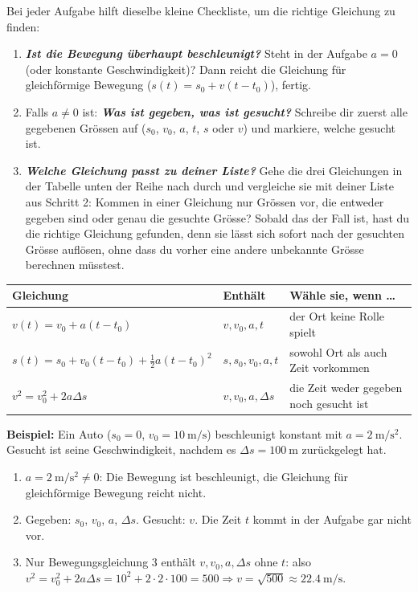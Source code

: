 \documentclass[addpoints,11pt,a4paper]{exam}
\begin{document}
\begin{anleitungbox}
Bei jeder Aufgabe hilft dieselbe kleine Checkliste, um die richtige
Gleichung zu finden:

\begin{enumerate}[leftmargin=1.2cm,itemsep=0.3em]
  \item \textbf{\emph{Ist die Bewegung überhaupt beschleunigt?}} Steht in
  der Aufgabe $a=0$ (oder \glqq konstante Geschwindigkeit\grqq{})? Dann
  reicht die Gleichung für gleichförmige Bewegung
  ($s(t)=s_0+v(t-t_0)$), fertig.
  \item Falls $a\neq0$ ist: \textbf{\emph{Was ist gegeben, was ist
  gesucht?}} Schreibe dir zuerst alle gegebenen Grössen auf
  ($s_0$, $v_0$, $a$, $t$, $s$ oder $v$) und markiere, welche gesucht
  ist.
  \item \textbf{\emph{Welche Gleichung passt zu deiner Liste?}} Gehe die
  drei Gleichungen in der Tabelle unten der Reihe nach durch und
  vergleiche sie mit deiner Liste aus Schritt 2: Kommen in einer Gleichung
  nur Grössen vor, die entweder gegeben sind oder genau die gesuchte
  Grösse? Sobald das der Fall ist, hast du die richtige Gleichung
  gefunden, denn sie lässt sich sofort nach der gesuchten Grösse auflösen,
  ohne dass du vorher eine andere unbekannte Grösse berechnen müsstest.
\end{enumerate}

\begin{center}
{\small
\setlength{\tabcolsep}{4pt}
\begin{tabular}{p{7.6cm}p{2.6cm}p{3.7cm}}
\toprule
\textbf{Gleichung} & \textbf{Enthält} & \textbf{Wähle sie, wenn \dots} \\
\midrule
$v(t)=v_0+a(t-t_0)$ & $v,v_0,a,t$ & der Ort keine Rolle spielt \\[0.3em]
$s(t)=s_0+v_0(t-t_0)+\frac{1}{2}a(t-t_0)^2$ & $s,s_0,v_0,a,t$ & sowohl Ort als auch Zeit vorkommen \\[0.3em]
$v^2=v_0^2+2a\Delta s$ & $v,v_0,a,\Delta s$ & die Zeit weder gegeben noch gesucht ist \\
\bottomrule
\end{tabular}
}
\end{center}

\textbf{Beispiel:} Ein Auto ($s_0=0$, $v_0=\SI{10}{\meter\per\second}$)
beschleunigt konstant mit $a=\SI{2}{\meter\per\second\squared}$. Gesucht
ist seine Geschwindigkeit, nachdem es $\Delta s=\SI{100}{\meter}$
zurückgelegt hat.
\begin{enumerate}[leftmargin=1.2cm,itemsep=0.25em]
  \item $a=\SI{2}{\meter\per\second\squared}\neq0$: Die Bewegung ist
  beschleunigt, die Gleichung für gleichförmige Bewegung reicht nicht.
  \item Gegeben: $s_0$, $v_0$, $a$, $\Delta s$. Gesucht: $v$. Die Zeit $t$
  kommt in der Aufgabe gar nicht vor.
  \item Nur Bewegungsgleichung 3 enthält $v,v_0,a,\Delta s$ ohne $t$: also
  $v^2=v_0^2+2a\Delta s = 10^2+2\cdot2\cdot100 = 500 \Rightarrow
  v=\sqrt{500}\approx\SI{22.4}{\meter\per\second}$.
\end{enumerate}
\end{anleitungbox}
\end{document}
